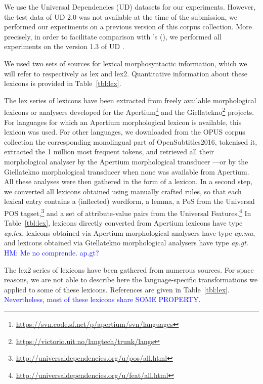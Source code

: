 \documentclass[11pt,letterpaper]{article}
\begin{document}
We use the Universal Dependencies (UD) datasets for our experiments. However, the test data of UD 2.0 was not available
at the time of the submission, we performed our experiments on a previous version of this corpus collection. More
precisely, in order to facilitate comparison with \citeauthor{plank16}'s (\citeyear{plank16}), we performed all
experiments on the version 1.3 of UD \cite{ud13}.

We used two sets of sources for lexical morphosyntactic information, which we will refer to respectively as {\sc lex}
and {\sc lex2}. Quantitative information about these lexicons is provided in Table~\ref{tbl:lex}.

The {\sc lex} series of lexicons have been extracted from freely available morphological lexicons or analysers developed
for the Apertium\footnote{\url{https://svn.code.sf.net/p/apertium/svn/languages}} and the
Giellatekno\footnote{\url{https://victorio.uit.no/langtech/trunk/langs}} projects. For languages for which an Apertium
morphological lexicon is available, this lexicon was used. For other languages, we downloaded from the OPUS corpus
collection the corresponding monolingual part of OpenSubtitles2016, tokenised it, extracted the 1 million most frequent
tokens, and retrieved all their morphological analyser by the Apertium morphological transducer ---or by the Giellatekno
morphological transducer when none was available from Apertium. All these analyses were then gathered in the form of a
lexicon. In a second step, we converted all lexicons obtained using manually crafted rules, so that each lexical entry
contains a (inflected) wordform, a lemma, a PoS from the Universal POS
tagset,\footnote{\url{http://universaldependencies.org/u/pos/all.html}} and a set of attribute-value pairs from the
Universal Features.\footnote{\url{http://universaldependencies.org/u/feat/all.html}} In Table~\ref{tbl:lex}, lexicons
directly converted from Apertium lexicons have type {\em ap.lex}, lexicons obtained via Apertium morphological analysers
have type {\em ap.ma}, and lexicons obtained via Giellatekno morphological analysers
have type {\em ap.gt}. \textcolor{blue}{HM: Me no comprende. ap.gt?}

The {\sc lex2} series of lexicons have been gathered from numerous sources. For space reasons, we are not able to describe
here the language-specific transformations we applied to some of these lexicons. References are given in
Table~\ref{tbl:lex}. \textcolor{blue}{Nevertheless, most of these lexicons share SOME PROPERTY. }
\end{document}
